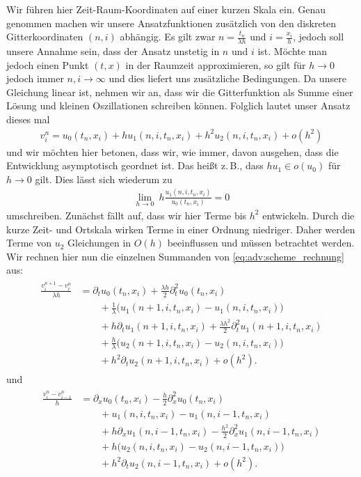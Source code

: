 Wir führen hier Zeit-Raum-Koordinaten auf einer kurzen Skala ein.
Genau genommen machen wir unsere Ansatzfunktionen zusätzlich von den diskreten Gitterkoordinaten $(n,i)$ abhängig.
Es gilt zwar $n = \frac {t_n} {\lambda h}$ und $i = \frac {x_i}{h}$, jedoch soll unsere Annahme sein, dass der Ansatz unstetig in $n$ und $i$ ist.
Möchte man jedoch einen Punkt $(t,x)$ in der Raumzeit approximieren, so gilt für $h \to 0$ jedoch immer $n,i \to \infty$ und dies liefert uns zusätzliche Bedingungen.
Da unsere Gleichung linear ist, nehmen wir an, dass wir die Gitterfunktion als Summe einer Lösung und kleinen Oszillationen schreiben können.
Folglich lautet unser Ansatz dieses mal
\begin{align}
v^n_i = u_0(t_n, x_i) + h u_1(n, i, t_n, x_i) + h^2 u_2(n, i, t_n, x_i) + o(h^2)
\end{align}
und wir möchten hier betonen, dass wir, wie immer, davon ausgehen, dass die Entwicklung asymptotisch geordnet ist.
Das heißt z.\,B., dass $h u_1 \in o(u_0)$ für $h \to 0$ gilt.
Dies lässt sich wiederum zu
\begin{align}
\lim_{h \to 0} \: h \frac{u_1(n, i, t_n, x_i)}{u_0(t_n, x_i)} = 0
\end{align}
umschreiben.
Zunächst fällt auf, dass wir hier Terme bis $h^2$ entwickeln.
Durch die kurze Zeit- und Ortskala wirken Terme in einer Ordnung niedriger.
Daher werden Terme von $u_2$ Gleichungen in $O(h)$ beeinflussen und müssen betrachtet werden.
Wir rechnen hier nun die einzelnen Summanden von \eqref{eq:adv:scheme_rechnung} aus:
{\small
\begin{align} \label{eq:adv:osz:diff1}
\begin{split}
\frac {v^{n+1}_i - v^n_i} {\lambda h}
&= \partial_t u_0(t_n, x_i) + \frac {\lambda h}{2} \partial^2_t u_0(t_n, x_i)\\
&\qquad + \frac 1 \lambda \bigl( u_1(n+1, i, t_n, x_i) - u_1(n, i, t_n, x_i) \bigr)\\
&\qquad + h \partial_t u_1(n+1, i, t_n, x_i) + \frac {\lambda h^2}{2} \partial^2_t u_1(n+1, i, t_n, x_i)\\
&\qquad + \frac h \lambda \bigl( u_2(n+1, i, t_n, x_i) - u_2(n, i, t_n, x_i) \bigr)\\
&\qquad + h^2 \partial_t u_2(n+1, i, t_n, x_i) + o(h^2).
\end{split}
\end{align}
} und
{\small 
\begin{align} \label{eq:adv:osz:diff2}
\begin{split}
\frac {v^n_i - v^n_{i-1}} h 
&= \partial_x u_0(t_n, x_i) - \frac {h}{2} \partial^2_x u_0(t_n, x_i)\\
&\qquad + u_1(n, i, t_n, x_i) - u_1(n, i-1, t_n, x_i)\\
&\qquad + h \partial_x u_1(n, i-1, t_n, x_i) - \frac {h^2}{2} \partial^2_x u_1(n, i-1, t_n, x_i)\\
&\qquad + h \bigl( u_2(n, i, t_n, x_i) - u_2(n, i-1, t_n, x_i) \bigr)\\
&\qquad + h^2 \partial_t u_2(n, i-1, t_n, x_i) + o(h^2).
\end{split}
\end{align}
}
